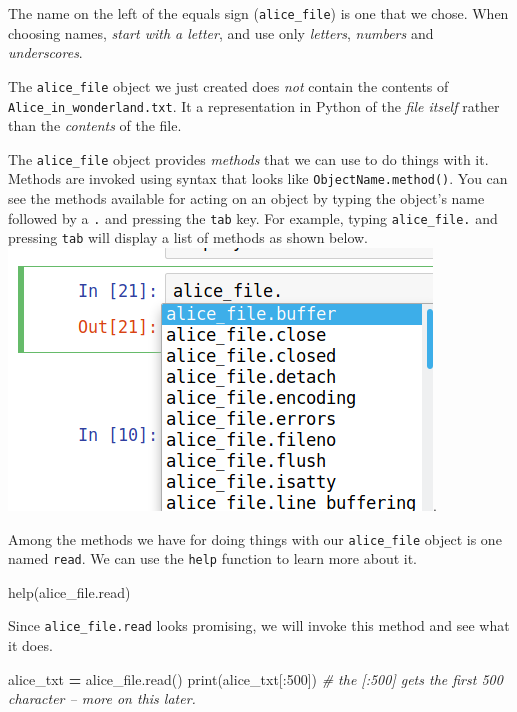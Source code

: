 \documentclass[]{book}
\newenvironment{Shaded}{\begin{snugshade}}{\end{snugshade}}
\newcommand{\DecValTok}[1]{\textcolor[rgb]{0.00,0.00,0.81}{#1}}
\newcommand{\CommentTok}[1]{\textcolor[rgb]{0.56,0.35,0.01}{\textit{#1}}}
\newcommand{\OperatorTok}[1]{\textcolor[rgb]{0.81,0.36,0.00}{\textbf{#1}}}
\newcommand{\BuiltInTok}[1]{#1}
\newcommand{\NormalTok}[1]{#1}
\begin{document}
The name on the left of the equals sign (\texttt{alice\_file}) is one
that we chose. When choosing names, \emph{start with a letter}, and use
only \emph{letters}, \emph{numbers} and \emph{underscores}.

The \texttt{alice\_file} object we just created does \emph{not} contain
the contents of \texttt{Alice\_in\_wonderland.txt}. It a representation
in Python of the \emph{file itself} rather than the \emph{contents} of
the file.

The \texttt{alice\_file} object provides \emph{methods} that we can use
to do things with it. Methods are invoked using syntax that looks like
\texttt{ObjectName.method()}. You can see the methods available for
acting on an object by typing the object's name followed by a \texttt{.}
and pressing the \texttt{tab} key. For example, typing
\texttt{alice\_file.} and pressing \texttt{tab} will display a list of
methods as shown below.
\includegraphics{Python/PythonIntro/images/notebook_file_completion.png}.

Among the methods we have for doing things with our \texttt{alice\_file}
object is one named \texttt{read}. We can use the \texttt{help} function
to learn more about it.

\begin{Shaded}
\begin{Highlighting}[]
\BuiltInTok{help}\NormalTok{(alice_file.read)}
\end{Highlighting}
\end{Shaded}

Since \texttt{alice\_file.read} looks promising, we will invoke this
method and see what it does.

\begin{Shaded}
\begin{Highlighting}[]
\NormalTok{alice_txt }\OperatorTok{=}\NormalTok{ alice_file.read()}
\BuiltInTok{print}\NormalTok{(alice_txt[:}\DecValTok{500}\NormalTok{]) }\CommentTok{# the [:500] gets the first 500 character -- more on this later.}
\end{Highlighting}
\end{Shaded}
\end{document}
